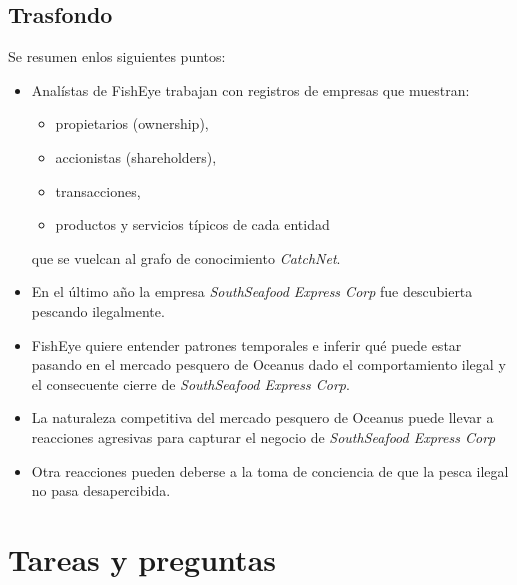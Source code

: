 \documentclass[11pt,spanish,a4paper]{article}
\begin{document}
\subsection{Trasfondo}
Se resumen enlos siguientes puntos:
\begin{itemize}
	\item Analístas de FishEye trabajan con registros de empresas que muestran:
	\begin{itemize}
		\item propietarios (ownership),
		\item accionistas (shareholders),
		\item transacciones,
		\item productos y servicios típicos de cada entidad
	\end{itemize}
	que se vuelcan al grafo de conocimiento \emph{CatchNet}.
	\item En el último año la empresa \emph{SouthSeafood Express Corp} fue descubierta pescando ilegalmente.
	\item FishEye quiere entender patrones temporales e inferir qué puede estar pasando en el mercado pesquero de Oceanus dado el comportamiento ilegal y el consecuente cierre de \emph{SouthSeafood Express Corp}. 
	\item La naturaleza competitiva del mercado pesquero de Oceanus puede llevar a reacciones agresivas para capturar el negocio de \emph{SouthSeafood Express Corp}
	\item Otra reacciones pueden deberse a la toma de conciencia de que la pesca ilegal no pasa desapercibida.
\end{itemize}


\section{Tareas y preguntas}
\end{document}
